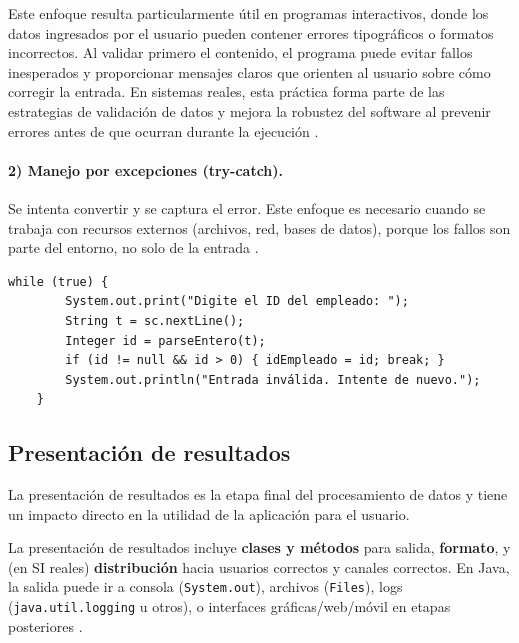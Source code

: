 \documentclass[12pt,twoside]{book}
\begin{document}
						Este enfoque resulta particularmente útil en programas interactivos, donde los datos ingresados por el usuario pueden contener errores tipográficos o formatos incorrectos. Al validar primero el contenido, el programa puede evitar fallos inesperados y proporcionar mensajes claros que orienten al usuario sobre cómo corregir la entrada. En sistemas reales, esta práctica forma parte de las estrategias de validación de datos y mejora la robustez del software al prevenir errores antes de que ocurran durante la ejecución \cite{Bloch2018EffectiveJava,Sommerville2015Software}.
						
						\paragraph{2) Manejo por excepciones (try-catch).} Se intenta convertir y se captura el error. Este enfoque es necesario cuando se trabaja con recursos externos (archivos, red, bases de datos), porque los fallos son parte del entorno, no solo de la entrada \cite{Pressman2019Software,Sommerville2015Software}.
						
						\begin{lstlisting}[style=Java,caption={Manejo de entrada inválida solicitando reintento (esquema).},label={lst:ReintentoEntrada}]
	while (true) {
		System.out.print("Digite el ID del empleado: ");
		String t = sc.nextLine();
		Integer id = parseEntero(t);
		if (id != null && id > 0) { idEmpleado = id; break; }
		System.out.println("Entrada inválida. Intente de nuevo.");
	} \end{lstlisting}
						
				\subsection{Presentación de resultados}
					\noindent
					La presentación de resultados es la etapa final del procesamiento de datos y tiene un impacto directo en la utilidad de la aplicación para el usuario.
					
					La presentación de resultados incluye \textbf{clases y métodos} para salida, \textbf{formato}, y (en SI reales) \textbf{distribución} hacia usuarios correctos y canales correctos. En Java, la salida puede ir a consola (\texttt{System.out}), archivos (\texttt{Files}), logs (\texttt{java.util.logging} u otros), o interfaces gráficas/web/móvil en etapas posteriores \cite{Pressman2019Software,Laudon2020Management}.
					
\end{document}
